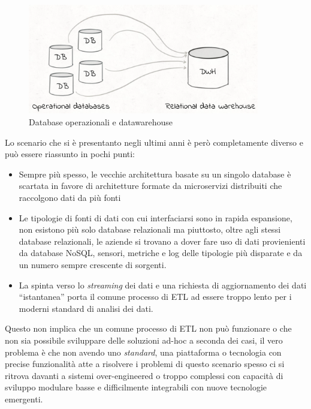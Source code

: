\documentclass[]{article}
\providecommand{\tightlist}{%
  \setlength{\itemsep}{0pt}\setlength{\parskip}{0pt}}
\begin{document}
\begin{figure}
\centering
\includegraphics[width=0.90000\textwidth]{../images/op-dwh.png}
\caption{Database operazionali e datawarehouse \label{figure_5}}
\end{figure}

\newpage 

Lo scenario che si è presentanto negli ultimi anni è però completamente
diverso e può essere riassunto in pochi punti:

\begin{itemize}
\tightlist
\item
  Sempre più spesso, le vecchie architettura basate su un singolo
  database è scartata in favore di architetture formate da microservizi
  distribuiti che raccolgono dati da più fonti
\item
  Le tipologie di fonti di dati con cui interfaciarsi sono in rapida
  espansione, non esistono più solo database relazionali ma piuttosto,
  oltre agli stessi database relazionali, le aziende si trovano a dover
  fare uso di dati provienienti da database NoSQL, sensori, metriche e
  log delle tipologie più disparate e da un numero sempre crescente di
  sorgenti.
\item
  La spinta verso lo \emph{streaming} dei dati e una richiesta di
  aggiornamento dei dati ``istantanea'' porta il comune processo di ETL
  ad essere troppo lento per i moderni standard di analisi dei dati.
\end{itemize}

Questo non implica che un comune processo di ETL non può funzionare o
che non sia possibile sviluppare delle soluzioni ad-hoc a seconda dei
casi, il vero problema è che non avendo uno \emph{standard}, una
piattaforma o tecnologia con precise funzionalità atte a risolvere i
problemi di questo scenario spesso ci si ritrova davanti a sistemi
over-engineered o troppo complessi con capacità di sviluppo modulare
basse e difficilmente integrabili con nuove tecnologie emergenti.
\end{document}
